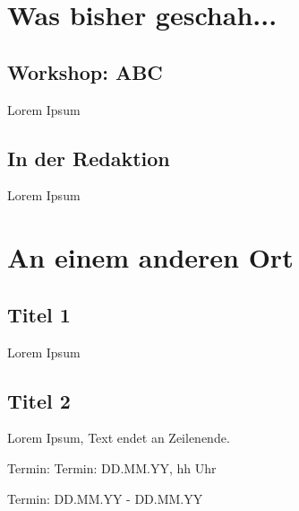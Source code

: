 
%



%


\multiauthor{}

\multidate{}

\multiausgabe{}

\multilosung{}



%



\makemultititle
%

\section{Was bisher geschah...}

\subsection{Workshop: ABC}
Lorem Ipsum

\subsection{In der Redaktion}
Lorem Ipsum

\section{An einem anderen Ort}

\subsection{Titel 1}
Lorem Ipsum

\subsection{Titel 2}
Lorem Ipsum, Text endet an Zeilenende.


\begin{termine}
\item Termin: Termin: DD.MM.YY, hh Uhr
  \item Termin: DD.MM.YY - DD.MM.YY
\end{termine}
\impressum


